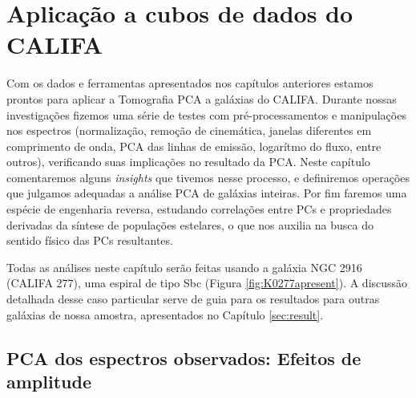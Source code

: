 



\chapter{Aplicação a cubos de dados do CALIFA}
\label{sec:PCAaplic}

Com os dados e ferramentas apresentados nos capítulos anteriores estamos prontos para aplicar a Tomografia PCA a
galáxias do CALIFA. Durante nossas investigações fizemos uma série de testes com pré-processamentos e manipulações nos
espectros (normalização, remoção de cinemática, janelas diferentes em comprimento de onda, PCA das linhas de emissão,
logarítmo do fluxo, entre outros), verificando suas implicações no resultado da PCA. Neste capítulo comentaremos alguns
{\em insights} que tivemos nesse processo, e definiremos operações que julgamos adequadas a análise PCA de galáxias
inteiras. Por fim faremos uma espécie de engenharia reversa, estudando correlações entre PCs e propriedades derivadas da
síntese de populações estelares, o que nos auxilia na busca do sentido físico das PCs resultantes.

Todas as análises neste capítulo serão feitas usando a galáxia NGC 2916 (CALIFA 277), uma espiral de tipo Sbc (Figura
\ref{fig:K0277apresent}). A discussão detalhada desse caso particular serve de guia para os resultados para outras
galáxias de nossa amostra, apresentados no Capítulo \ref{sec:result}.

\section{PCA dos espectros observados: Efeitos de amplitude}
\label{sec:PCAaplic:norm}

